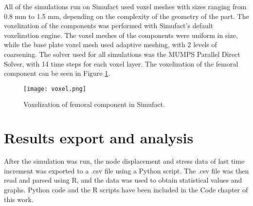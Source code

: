\documentclass[../main.tex]{subfiles}
\begin{document}
All of the simulations run on Simufact used voxel meshes with sizes ranging from 0.8 mm to 1.5 mm, depending on the complexity of the geometry of the part. The voxelization of the components was performed with Simufact's default voxelization engine. The voxel meshes of the components were uniform in size, while the base plate voxel mesh used adaptive meshing, with 2 levels of coarsening. The solver used for all simulations was the MUMPS Parallel Direct Solver, with 14 time steps for each voxel layer. The voxelization of the femoral component can be seen in Figure \ref{fig:femvox}.

\begin{figure}[h!]
  \centering
  \texttt{[image: voxel.png]}
  \caption{Voxelization of femoral component in Simufact.}
  \label{fig:femvox}
\end{figure}

\section{Results export and analysis}

After the simulation was run, the node displacement and stress data of last time increment was exported to a .csv file using a Python script. The .csv file was then read and parsed using R, and the data was used to obtain statistical values and graphs. Python code and the R scripts have been included in the Code chapter of this work. 

\listoftodos
\end{document}
